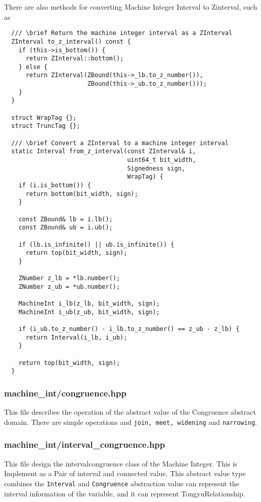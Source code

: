 \documentclass[12pt]{article}
\begin{document}
There are also methods for converting Machine Integer Interval to Zinterval, such as
\begin{lstlisting}
  /// \brief Return the machine integer interval as a ZInterval
  ZInterval to_z_interval() const {
    if (this->is_bottom()) {
      return ZInterval::bottom();
    } else {
      return ZInterval(ZBound(this->_lb.to_z_number()),
                       ZBound(this->_ub.to_z_number()));
    }
  }

  struct WrapTag {};
  struct TruncTag {};

  /// \brief Convert a ZInterval to a machine integer interval
  static Interval from_z_interval(const ZInterval& i,
                                  uint64_t bit_width,
                                  Signedness sign,
                                  WrapTag) {
    if (i.is_bottom()) {
      return bottom(bit_width, sign);
    }

    const ZBound& lb = i.lb();
    const ZBound& ub = i.ub();

    if (lb.is_infinite() || ub.is_infinite()) {
      return top(bit_width, sign);
    }

    ZNumber z_lb = *lb.number();
    ZNumber z_ub = *ub.number();

    MachineInt i_lb(z_lb, bit_width, sign);
    MachineInt i_ub(z_ub, bit_width, sign);

    if (i_ub.to_z_number() - i_lb.to_z_number() == z_ub - z_lb) {
      return Interval(i_lb, i_ub);
    }

    return top(bit_width, sign);
  }
\end{lstlisting}

\subsubsection{machine\_int/congruence.hpp}
This file describes the operation of the abstract value of the Congruence abstract domain. There are simple operations and \texttt{join, meet, widening} and \texttt{narrowing}.

\subsubsection{machine\_int/interval\_congruence.hpp}
This file design the intervalcongruence class of the Machine Integer. This is Implement as a Pair of interval and connected value. This abstract value type combines the \texttt{Interval} and \texttt{Congruence} abstraction value can represent the interval information of the variable, and it can represent TongyuRelationship.
\end{document}
